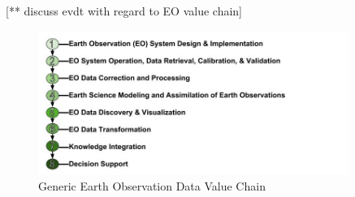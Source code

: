 \chapter{} \label{ch:discussion}



[** discuss evdt with regard to EO value chain]

\begin{figure}[h]
\centering
\includegraphics[width=0.9\textwidth]{Figures/chap6/EOChain.jpg}
\caption[Generic Earth Observation Data Value Chain]{Generic Earth Observation Data Value Chain}
\label{fig:eochain}
\end{figure}


\section{}


\section{} \label{sec:future}


